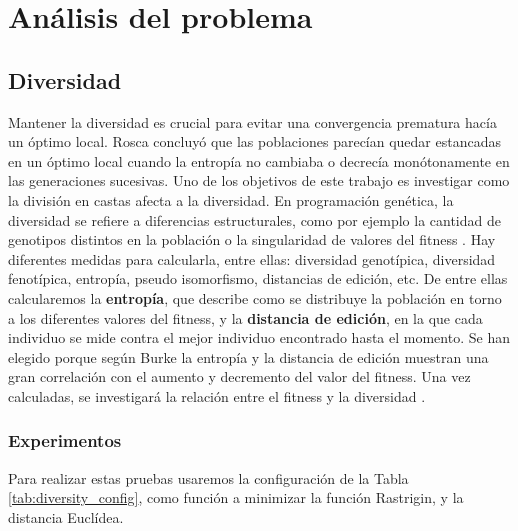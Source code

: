 \chapter{Análisis del problema}

\section{Diversidad}

Mantener la diversidad es crucial para evitar una convergencia prematura hacía un óptimo local. Rosca \cite{Rosca} concluyó que las poblaciones parecían quedar estancadas
en un óptimo local cuando la entropía no cambiaba o decrecía monótonamente en las generaciones sucesivas. Uno de los objetivos de este trabajo es investigar como la 
división en castas afecta a la diversidad. En programación genética, la diversidad se refiere a diferencias estructurales, como por ejemplo la cantidad de genotipos 
distintos en la población o la singularidad de valores del fitness \cite{genetic}. Hay diferentes medidas para calcularla, entre ellas: diversidad genotípica, 
diversidad fenotípica, entropía, pseudo isomorfismo, distancias de edición, etc. De entre ellas calcularemos la \textbf{entropía}, que describe como se distribuye la
población en torno a los diferentes valores del fitness, y la \textbf{distancia de edición}, en la que cada individuo se mide contra el mejor individuo encontrado hasta el 
momento. Se han elegido porque según Burke \cite{diversity} la entropía y la distancia de edición muestran una gran correlación con el aumento y decremento del valor 
del fitness. Una vez calculadas, se investigará la relación entre el fitness y la diversidad \cite{diversity}. 

\subsection{Experimentos}

Para realizar estas pruebas usaremos la configuración de la Tabla \ref{tab:diversity_config}, como función a minimizar la función Rastrigin\cite{BBOB}, y la distancia Euclídea.

